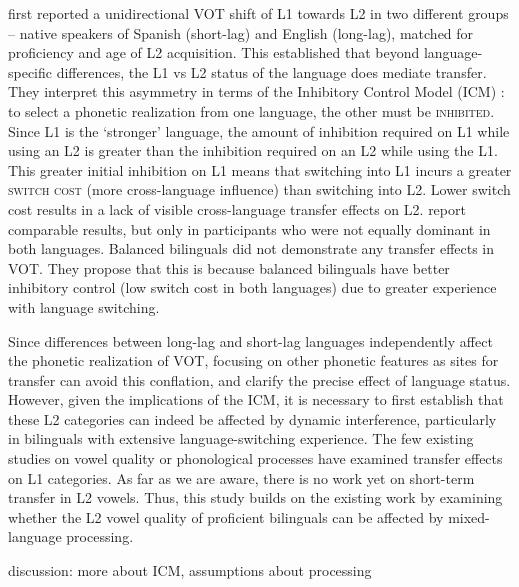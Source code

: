 \documentclass[12 pt]{article}
\begin{document}
\cite{olson2013bilingual} first reported a unidirectional VOT shift of L1 towards L2 in two different groups -- native speakers of Spanish (short-lag) and English (long-lag), matched for proficiency and age of L2 acquisition. This established that beyond language-specific differences, the L1 vs L2 status of the language does mediate transfer. They interpret this asymmetry in terms of the Inhibitory Control Model (ICM) \citep{green1998mental}: to select a phonetic realization from one language, the other must be \textsc{inhibited}. Since L1 is the `stronger' language, the amount of inhibition required on L1 while using an L2 is greater than the inhibition required on an L2 while using the L1. This greater initial inhibition on L1 means that switching into L1 incurs a greater \textsc{switch cost} (more cross-language influence) than switching into L2. Lower switch cost results in a lack of visible cross-language transfer effects on L2. \cite{tsui2019impact} report comparable results, but only in participants who were not equally dominant in both languages. Balanced bilinguals did not demonstrate any transfer effects in VOT. They propose that this is because balanced bilinguals have better inhibitory control (low switch cost in both languages) due to greater experience with language switching.

Since differences between long-lag and short-lag languages independently affect the phonetic realization of VOT, focusing on other phonetic features as sites for transfer can avoid this conflation, and clarify the precise effect of language status. However, given the implications of the ICM, it is necessary to first establish that these L2 categories can indeed be affected by dynamic interference, particularly in bilinguals with extensive language-switching experience. The few existing studies on vowel quality \citep{simonet2014phonetic,muldner2019phonetics,elias2017effects} or phonological processes \citep{simonet2020increased,schwartz2015language} have examined transfer effects on L1 categories. As far as we are aware, there is no work yet on short-term transfer in L2 vowels. Thus, this study builds on the existing work by examining whether the L2 vowel quality of proficient bilinguals can be affected by mixed-language processing.

\alert{discussion: more about ICM, assumptions about processing}
\end{document}
